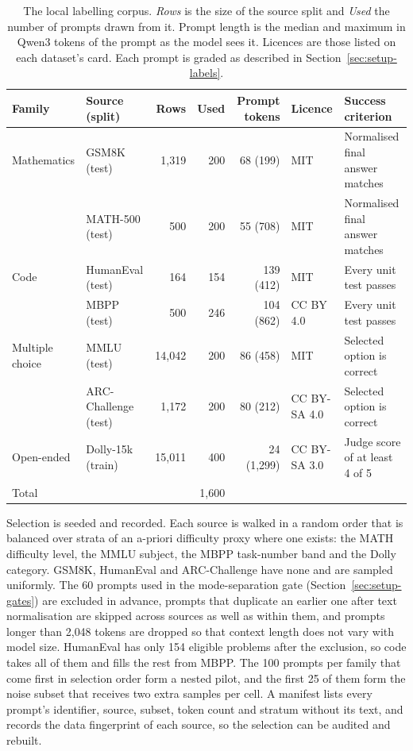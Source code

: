 \documentclass[final,5p,times,twocolumn]{elsarticle}
\theoremstyle{plain}
\begin{document}
\begin{table}[ht]
\centering
\small
\caption{The local labelling corpus. \emph{Rows} is the size of the source
split and \emph{Used} the number of prompts drawn from it. Prompt length is
the median and maximum in Qwen3 tokens of the prompt as the model sees it.
Licences are those listed on each dataset's card. Each prompt is graded as
described in Section~\ref{sec:setup-labels}.}
\label{tab:corpus}
\renewcommand{\arraystretch}{1.1}
\begin{tabularx}{\textwidth}{@{}l l r r r l >{\raggedright\arraybackslash}X@{}}
\toprule
Family & Source (split) & Rows & Used & Prompt tokens & Licence & Success criterion \\
\midrule
Mathematics & GSM8K (test)          &  1{,}319 & 200 & 68 (199)   & MIT & Normalised final answer matches \\
            & MATH-500 (test)       &      500 & 200 & 55 (708)   & MIT & Normalised final answer matches \\
Code        & HumanEval (test)      &      164 & 154 & 139 (412)  & MIT & Every unit test passes \\
            & MBPP (test)           &      500 & 246 & 104 (862)  & CC BY 4.0 & Every unit test passes \\
Multiple choice & MMLU (test)       & 14{,}042 & 200 & 86 (458)   & MIT & Selected option is correct \\
            & ARC-Challenge (test)  &  1{,}172 & 200 & 80 (212)   & CC BY-SA 4.0 & Selected option is correct \\
Open-ended  & Dolly-15k (train)     & 15{,}011 & 400 & 24 (1{,}299) & CC BY-SA 3.0 & Judge score of at least 4 of 5 \\
\midrule
Total       &                       &          & 1{,}600 & & & \\
\bottomrule
\end{tabularx}
\end{table}

Selection is seeded and recorded. Each source is walked in a random order
that is balanced over strata of an a-priori difficulty proxy where one
exists: the MATH difficulty level, the MMLU subject, the MBPP task-number
band and the Dolly category. GSM8K, HumanEval and ARC-Challenge have none and
are sampled uniformly. The 60 prompts used in the mode-separation gate
(Section~\ref{sec:setup-gates}) are excluded in advance, prompts that
duplicate an earlier one after text normalisation are skipped across sources
as well as within them, and prompts longer than 2{,}048 tokens are dropped so
that context length does not vary with model size. HumanEval has only 154
eligible problems after the exclusion, so code takes all of them and fills the
rest from MBPP. The 100 prompts per family that come first in selection order
form a nested pilot, and the first 25 of them form the noise subset that
receives two extra samples per cell. A manifest lists every prompt's
identifier, source, subset, token count and stratum without its text, and
records the data fingerprint of each source, so the selection can be audited
and rebuilt.
\end{document}
